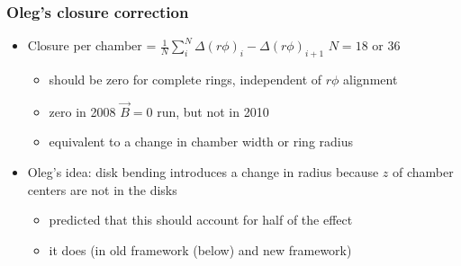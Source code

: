 \documentclass[compress]{beamer}
\begin{document}
\begin{frame}
\frametitle{Oleg's closure correction}

\begin{itemize}
\item Closure per chamber = $\displaystyle \frac{1}{N} \sum_i^{N} \Delta (r\phi)_i - \Delta (r\phi)_{i+1}$ \hfill $N=18$ or $36$

\begin{itemize}
\item should be zero for complete rings, independent of $r\phi$ alignment
\item zero in 2008 $\vec{B}=0$ run, but not in 2010
\item equivalent to a change in chamber width or ring radius
\end{itemize}

\item Oleg's idea: disk bending introduces a change in radius because
  $z$ of chamber centers are not in the disks
\begin{itemize}
\item predicted that this should account for half of the effect
\item<2> it does (in old framework (below) and new framework)
\end{itemize}
\end{itemize}

\begin{center}
\end{center}
\end{frame}
\end{document}

